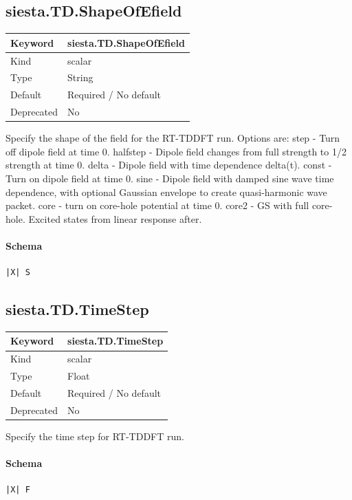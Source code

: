 \documentclass[11pt]{article}
\begin{document}
{{{{{\subsection{siesta.TD.ShapeOfEfield}
\label{kw:siesta-TD-ShapeOfEfield}
\begin{longtable}{|p{1.5in}|p{4.5in}|}
\hline
Keyword & siesta.TD.ShapeOfEfield \\
\hline
Kind & scalar \\
\hline
Type & String \\
\hline
Default & Required / No default \\
\hline
Deprecated & No \\
\hline
\end{longtable}
 Specify the shape of the field for the RT-TDDFT run.
 Options are:
 step     - Turn off dipole field at time 0.
 halfstep - Dipole field changes from full strength to 1/2
            strength at time 0.
 delta    - Dipole field with time dependence delta(t).
 const    - Turn on dipole field at time 0.
 sine     - Dipole field with damped sine wave time dependence,
            with optional Gaussian envelope to create quasi-harmonic
            wave packet.
 core     - turn on core-hole potential at time 0.
 core2    - GS with full core-hole. Excited states from linear response after.

\paragraph{Schema}
\begin{Verbatim}
|X| S
\end{Verbatim}

\subsection{siesta.TD.TimeStep}
\label{kw:siesta-TD-TimeStep}
\begin{longtable}{|p{1.5in}|p{4.5in}|}
\hline
Keyword & siesta.TD.TimeStep \\
\hline
Kind & scalar \\
\hline
Type & Float \\
\hline
Default & Required / No default \\
\hline
Deprecated & No \\
\hline
\end{longtable}
 Specify the time step for RT-TDDFT run.

\paragraph{Schema}
\begin{Verbatim}
|X| F
\end{Verbatim}

}}}}}
\end{document}
